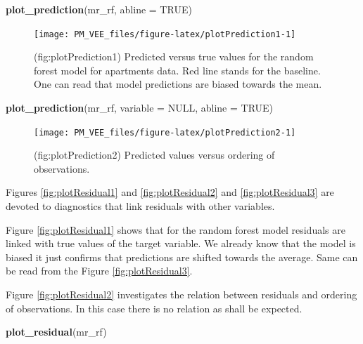 \documentclass[12pt,]{krantz}
\newenvironment{Shaded}{\begin{snugshade}}{\end{snugshade}}
\newcommand{\DataTypeTok}[1]{\textcolor[rgb]{0.13,0.29,0.53}{#1}}
\newcommand{\KeywordTok}[1]{\textcolor[rgb]{0.13,0.29,0.53}{\textbf{#1}}}
\newcommand{\NormalTok}[1]{#1}
\newcommand{\OtherTok}[1]{\textcolor[rgb]{0.56,0.35,0.01}{#1}}
\begin{document}
\begin{Shaded}
\begin{Highlighting}[]
\KeywordTok{plot_prediction}\NormalTok{(mr_rf, }\DataTypeTok{abline =} \OtherTok{TRUE}\NormalTok{)}
\end{Highlighting}
\end{Shaded}

\begin{figure}

{\centering \texttt{[image: PM\_VEE\_files/figure-latex/plotPrediction1-1]} 

}

\caption{(fig:plotPrediction1) Predicted versus true values for the random forest model for apartments data. Red line stands for the baseline. One can read that model predictions are biased towards the mean.}\label{fig:plotPrediction1}
\end{figure}

\begin{Shaded}
\begin{Highlighting}[]
\KeywordTok{plot_prediction}\NormalTok{(mr_rf, }\DataTypeTok{variable =} \OtherTok{NULL}\NormalTok{, }\DataTypeTok{abline =} \OtherTok{TRUE}\NormalTok{)}
\end{Highlighting}
\end{Shaded}

\begin{figure}

{\centering \texttt{[image: PM\_VEE\_files/figure-latex/plotPrediction2-1]} 

}

\caption{(fig:plotPrediction2) Predicted values versus ordering of observations. }\label{fig:plotPrediction2}
\end{figure}

Figures \ref{fig:plotResidual1} and \ref{fig:plotResidual2} and \ref{fig:plotResidual3} are devoted to diagnostics that link residuals with other variables.

Figure \ref{fig:plotResidual1} shows that for the random forest model residuals are linked with true values of the target variable. We already know that the model is biased it just confirms that predictions are shifted towards the average. Same can be read from the Figure \ref{fig:plotResidual3}.

Figure \ref{fig:plotResidual2} investigates the relation between residuals and ordering of observations. In this case there is no relation as shall be expected.

\begin{Shaded}
\begin{Highlighting}[]
\KeywordTok{plot_residual}\NormalTok{(mr_rf)}
\end{Highlighting}
\end{Shaded}
\end{document}
